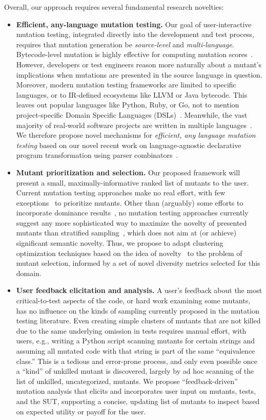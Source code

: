 Overall, our approach requires several fundamental research novelties:
\begin{itemize}
\item \textbf{Efficient, any-language mutation testing.}  
Our goal of user-interactive mutation testing, integrated directly into
the development and test process, requires that mutation generation be
\emph{source-level} and \emph{multi-language}.
Bytecode-level mutation is highly effective for computing
mutation scores~\cite{pittest,HaririLLVM}.  However, developers or test
engineers reason more naturally about a mutant's implications when mutations
are presented in the source language in question.  Moreover, modern mutation
testing frameworks are limited to specific languages, or to IR-defined
ecosystems like LLVM or Java bytecode.  This leaves out popular languages like Python, Ruby, or Go, not
to mention project-specific Domain Specific Languages (DSLs)~\cite{Fow10}.
Meanwhile, the vast majority of
real-world software projects are written in multiple languages~\cite{Ray2014}.
We therefore propose novel mechanisms for \emph{efficient, any language mutation
  testing} based on our novel recent work on language-agnostic declarative
program transformation using parser combinators~\cite{rvt-ppc}.  
\item \textbf{Mutant prioritization and selection.}  Our
  proposed framework will present a small, maximally-informative ranked list of
  mutants to the user.  
Current mutation testing approaches make
no real effort, with few exceptions~\cite{MutGoogle,FaRM} to prioritize mutants.
Other than (arguably) some efforts to
incorporate dominance results~\cite{MutQuality}, no mutation testing approaches
currently suggest any more sophisticated way to maximize the novelty of
presented mutants than stratified sampling~\cite{gopinath2017mutation}, which
does not aim at (or achieve) significant semantic novelty.  Thus,
we propose to adapt clustering optimization techniques based on the idea of
novelty~\cite{Gonzalez85} to the problem of mutant selection, informed by a set
of novel diversity metrics selected for this domain. 
\item \textbf{User feedback elicitation and analysis.}
A
user's feedback about the most critical-to-test aspects of the code, or hard
work examining some mutants, has no influence on the kinds of sampling currently
proposed in the mutation testing literature.  
Even creating simple clusters of
mutants that are not killed due to the same underlying omission in tests
requires manual effort, with users, e.g., writing a Python script scanning
mutants for certain strings and assuming all mutated code with that string is
part of the same ``equivalence class.''  This is a tedious and error-prone
process, and only even possible once a ``kind'' of unkilled mutant is
discovered, largely by ad hoc scanning of the list of unkilled, uncategorized,
mutants.  
We propose ``feedback-driven'' mutation analysis that elicits and incorporates
user input on mutants, tests, and the SUT, supporting a concise, updating list
of mutants to inspect based on expected utility or payoff for the user.
\end{itemize}

